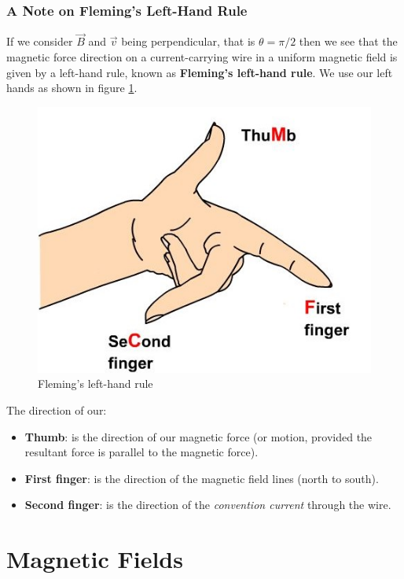 \subsubsection*{A Note on Fleming's Left-Hand Rule}

If we consider $\vec{B}$ and $\vec{v}$ being perpendicular, that is $\theta = \pi/2$ then we see that the magnetic force direction on a current-carrying wire in a uniform magnetic field is given by a left-hand rule, known as \textbf{Fleming's left-hand rule}. We use our left hands as shown in figure \ref{fig:fleming-left-hand}.

\begin{figure}[h!]
    \centering
    \includegraphics[scale=0.6]{notes/images/Fleming-Left-Hand.JPG}
    \caption{Fleming's left-hand rule}
    \label{fig:fleming-left-hand}
\end{figure}
\FloatBarrier

\noindent The direction of our:
\begin{itemize}
    \item \textbf{Thumb}: is the direction of our magnetic force (or motion, provided the resultant force is parallel to the magnetic force).
    \item \textbf{First finger}: is the direction of the magnetic field lines (north to south). 
    \item \textbf{Second finger}: is the direction of the \textit{convention current} through the wire. 
\end{itemize}

\section{Magnetic Fields}

